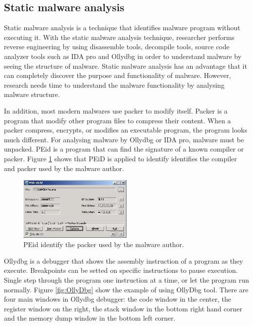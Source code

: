 \subsection{Static malware analysis}

Static malware analysis is a technique that identifies malware program without executing it. With the static malware analysis technique, researcher performs reverse engineering by using disassemble tools, decompile tools, source code analyzer tools such as IDA pro and Ollydbg in order to understand malware by seeing the structure of malware. Static malware analysis has an advantage that it can completely discover the purpose and functionality of malware. However, research needs time to understand the malware functionality by analysing malware structure.

In addition, most modern malwares use packer to modify itself. Packer is a program that modify other program files to compress their content. When a packer compress, encrypts, or modifies an executable program, the program looks much different. For analysing malware by Ollydbg or IDA pro, malware must be unpacked. PEid is a program that can find the signature of a known compiler or packer. Figure \ref{fig:PEid} shows that PEiD is applied to identify identifies the compiler and packer used by the malware author.

\begin{figure}[h!]
\centering
\includegraphics[width=0.5\textwidth]{graph/PEid.jpg}
\caption{PEid identify the packer used by the malware author.}
\label{fig:PEid}
\end{figure}

Ollydbg is a debugger that shows the assembly instruction of a program as they execute. Breakpoints can be setted on specific instructions to pause execution. Single step through the program one instruction at a time, or let the program run normally. Figure \ref{fig:OllyDbg} show the example of using OllyDbg tool. There are four main windows in Ollydbg debugger: the code window in the center, the register window on the right, the stack window in the bottom right hand  corner and the memory dump window in the bottom left corner. 

